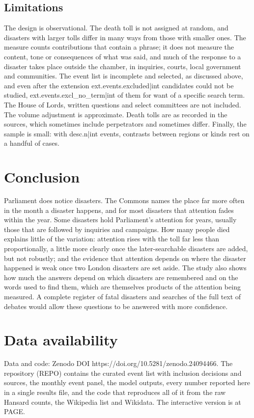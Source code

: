 \documentclass[11pt,a4paper]{article}
\begin{document}
\subsection{Limitations}
The design is observational. The death toll is not assigned at random, and disasters with larger tolls differ in many ways from those with smaller ones. The measure counts contributions that contain a phrase; it does not measure the content, tone or consequences of what was said, and much of the response to a disaster takes place outside the chamber, in inquiries, courts, local government and communities. The event list is incomplete and selected, as discussed above, and even after the extension {{ext.events.excluded|int}} candidates could not be studied, {{ext.events.excl_no_term|int}} of them for want of a specific search term. The House of Lords, written questions and select committees are not included. The volume adjustment is approximate. Death tolls are as recorded in the sources, which sometimes include perpetrators and sometimes differ. Finally, the sample is small: with {{desc.n|int}} events, contrasts between regions or kinds rest on a handful of cases.

\section{Conclusion}
\label{sec:conclusion}
Parliament does notice disasters. The Commons names the place far more often in the month a disaster happens, and for most disasters that attention fades within the year. Some disasters hold Parliament's attention for years, usually those that are followed by inquiries and campaigns. How many people died explains little of the variation: attention rises with the toll far less than proportionally, a little more clearly once the later-searchable disasters are added, but not robustly; and the evidence that attention depends on where the disaster happened is weak once two London disasters are set aside. The study also shows how much the answers depend on which disasters are remembered and on the words used to find them, which are themselves products of the attention being measured. A complete register of fatal disasters and searches of the full text of debates would allow these questions to be answered with more confidence.

\section*{Data availability}
Data and code: Zenodo DOI https://doi.org/10.5281/zenodo.24094466. The repository ({{REPO}}) contains the curated event list with inclusion decisions and sources, the monthly event panel, the model outputs, every number reported here in a single results file, and the code that reproduces all of it from the raw Hansard counts, the Wikipedia list and Wikidata. The interactive version is at {{PAGE}}.
\end{document}
